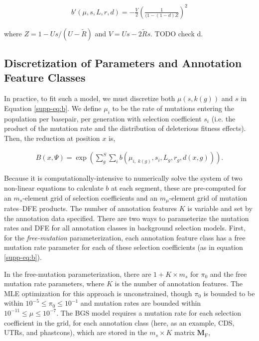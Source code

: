 \documentclass[11pt]{article}
\begin{document}
\begin{align} 
    b'(\mu, s, L, r, d) = -\frac{V}{2} \left(\frac{1}{(1-(1-d)Z}\right)^2 
\end{align}

where $Z = 1 - Us / (U-\widetilde{R})$ and $V = Us - 2\widetilde{R}s$. TODO
check d.


\subsection{Discretization of Parameters and Annotation Feature Classes}

In practice, to fit such a model, we must discretize both $\mu(s, k(g))$ and
$s$ in Equation \eqref{supp-eq:b}. We define $\mu_i$ to be the rate of
mutations entering the population per basepair, per generation with selection
coefficient $s_i$ (i.e. the product of the mutation rate and the distribution
of deleterious fitness effects). Then, the reduction at position $x$ is,

\begin{align}
  \label{supp-eq:b}
  B(x, \Psi) = \exp \left( \sum_g^S \sum_{i} b\left( \mu_{i, \;k(g)}, s_i, L_g, r_g, d(x, g) \right)\right).
\end{align}


Because it is computationally-intensive to numerically solve the system of two
non-linear equations to calculate $b$ at each segment, these are pre-computed
for an $m_s$-element grid of selection coefficients and an $m_\mu$-element grid
of mutation rates--DFE products. The number of annotation features $K$ is
variable and set by the annotation data specified. There are two ways to
parameterize the mutation rates and DFE for all annotation classes in
background selection models. First, for the \emph{free-mutation}
parameterization, each annotation feature class has a free mutation rate
parameter for each of these selection coefficients (as in equation
\eqref{supp-eq:b}).

In the free-mutation parameterization, there are $1 + K \times m_s$ for $\pi_0$
and the free mutation rate parameters, where $K$ is the number of annotation
features. The MLE optimization for this approach is unconstrained, though
$\pi_0$ is bounded to be within $10^{-5} \le \pi_0 \le 10^{-1}$ and mutation
rates are bounded within $10^{-11} \le \mu \le 10^{-7}$. The BGS model requires
a mutation rate for each selection coefficient in the grid, for each annotation
class (here, as an example, CDS, UTRs, and phastcons), which are stored in the
$m_s \times K$ matrix $\mathbf{M}_\text{F}$,
\end{document}
